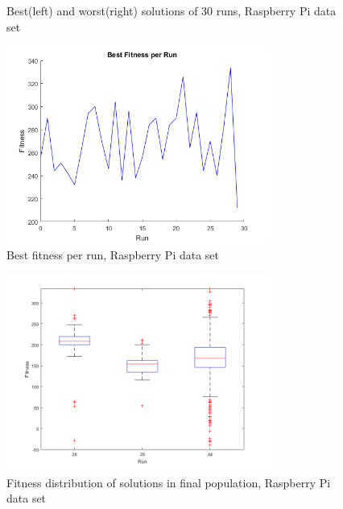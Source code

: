 \documentclass[conference]{IEEEtran}
\begin{document}
\begin{figure}[ht]
\centering
{}
\caption{Best(left) and worst(right) solutions of 30 runs, Raspberry Pi data set}
\label{fig:rasbpi_layout_best_worst}
\end{figure}

\begin{figure}[ht]
\centering
\includegraphics[width=3.4in]{dataset_rasbpi/best_fitness.png}
\caption{Best fitness per run, Raspberry Pi data set}
\label{fig:rasbpi_best_fitness_per_run}
\end{figure}

\begin{figure}[ht]
\centering
\includegraphics[width=3.4in]{dataset_rasbpi/boxplots.png}
\caption{Fitness distribution of solutions in final population, Raspberry Pi data set}
\label{fig:rasbpi_boxplots}
\end{figure}
\end{document}
